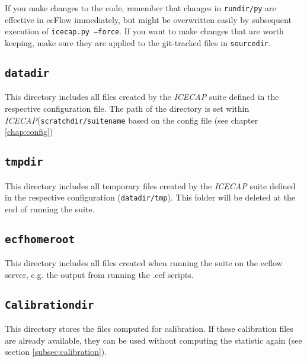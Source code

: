 \documentclass[DIV=10, parskip=full]{scrreprt}
\newcommand{\ice}{\textit{ICECAP}\xspace}
\begin{document}

If you make changes to the code, remember that changes in \texttt{rundir/py} are effective in ecFlow immediately, but might be overwritten easily by subsequent execution of \texttt{icecap.py --force}. If you want to make changes that are worth keeping, make sure they are applied to the git-tracked files in \texttt{sourcedir}.

\subsection{\texttt{datadir}}
This directory includes all files created by the \ice suite defined in the respective configuration file. The path of the directory is set within \ice  (\texttt{scratchdir/suitename} based on the config file (see chapter \ref{chap:config})\\


\subsection{\texttt{tmpdir}}
This directory includes all temporary files created by the \ice suite defined in the respective configuration (\texttt{datadir/tmp}). This folder will be deleted at the end of running the suite.

\subsection{\texttt{ecfhomeroot}}
This directory includes all files created when running the suite on the ecflow server, e.g. the output from running the .ecf scripts.

\subsection{\texttt{Calibrationdir}}
This directory stores the files computed for calibration. If these calibration files are already available, they can be used without computing the statistic again (see section \ref{subsec:calibration}).
\end{document}
